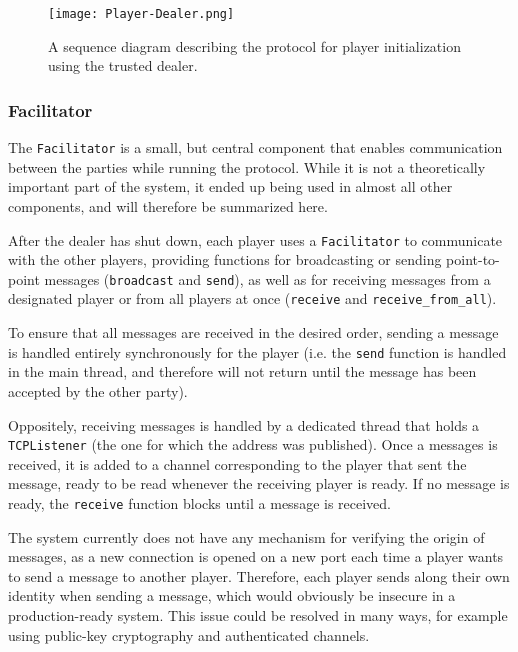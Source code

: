 \documentclass[../main.tex]{subfiles}
\begin{document}
\begin{figure}
    \centering
    \texttt{[image: Player-Dealer.png]}
    \caption{A sequence diagram describing the protocol for player initialization using the trusted dealer.}
    \label{fig:dealer-player}
\end{figure}

\subsubsection{Facilitator}

The \lstinline{Facilitator} is a small, but central component that enables communication between the parties while running the protocol.
While it is not a theoretically important part of the system, it ended up being used in almost all other components, and will therefore be summarized here.

After the dealer has shut down, each player uses a \lstinline{Facilitator} to communicate with the other players, providing functions for broadcasting or sending point-to-point messages (\lstinline{broadcast} and \lstinline{send}), as well as for receiving messages from a designated player or from all players at once (\lstinline{receive} and \lstinline{receive_from_all}).

To ensure that all messages are received in the desired order, sending a message is handled entirely synchronously for the player (i.e. the \lstinline{send} function is handled in the main thread, and therefore will not return until the message has been accepted by the other party).

Oppositely, receiving messages is handled by a dedicated thread that holds a \lstinline{TCPListener} (the one for which the address was published).
Once a messages is received, it is added to a channel corresponding to the player that sent the message, ready to be read whenever the receiving player is ready.
If no message is ready, the \lstinline{receive} function blocks until a message is received.

The system currently does not have any mechanism for verifying the origin of messages, as a new connection is opened on a new port each time a player wants to send a message to another player.
Therefore, each player sends along their own identity when sending a message, which would obviously be insecure in a production-ready system.
This issue could be resolved in many ways, for example using public-key cryptography and authenticated channels.
\end{document}
